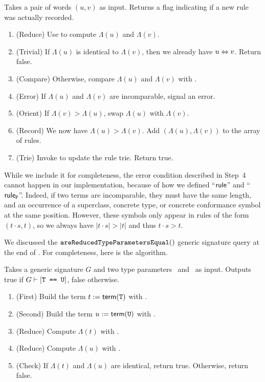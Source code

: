 \documentclass[../generics]{subfiles}
\begin{document}
\begin{algorithm}\label{add rewrite rule}
Takes a pair of words $(u,v)$ as input. Returns a flag indicating if a new rule was actually recorded.
\begin{enumerate}
\item (Reduce) Use  to compute $\Lambda(u)$ and $\Lambda(v)$.
\item (Trivial) If $\Lambda(u)$ is identical to $\Lambda(v)$, then we already have $u\Leftrightarrow v$. Return false.
\item (Compare) Otherwise, compare $\Lambda(u)$ and $\Lambda(v)$ with .
\item (Error) If $\Lambda(u)$ and $\Lambda(v)$ are incomparable, signal an error.
\item (Orient) If $\Lambda(v)>\Lambda(u)$, swap $\Lambda(u)$ with $\Lambda(v)$.
\item (Record) We now have $\Lambda(u)>\Lambda(v)$. Add $(\Lambda(u),\Lambda(v))$ to the array of rules.
\item (Trie) Invoke  to update the rule trie. Return true.
\end{enumerate}
\end{algorithm}
While we include it for completeness, the error condition described in Step~4 cannot happen in our implementation, because of how we defined ``$\mathsf{rule}$'' and ``$\mathsf{rule}_{\texttt{P}}$''. Indeed, if two terms are incomparable, they must have the same length, and an occurrence of a superclass, concrete type, or concrete conformance symbol at the same position. However, these symbols only appear in rules of the form $(t\cdot s,t)$, so we always have $|t\cdot s|>|t|$ and thus $t\cdot s>t$.

\pagebreak

We discussed the $\texttt{areReducedTypeParametersEqual}()$ generic signature query at the end of . For completeness, here is the algorithm.

\begin{algorithm}\label{alg:areReducedTypeParametersEqual}
Takes a generic signature $G$ and two type parameters \tT\ and \tU\ as input. Outputs true if $G\vdash\SameReq{\tT}{\tU}$, false otherwise.
\begin{enumerate}
\item (First) Build the term $t := \mathsf{term}(\texttt{T})$ with .
\item (Second) Build the term $u := \mathsf{term}(\texttt{U})$ with .
\item (Reduce) Compute $\Lambda(t)$ with .
\item (Reduce) Compute $\Lambda(u)$ with .
\item (Check) If $\Lambda(t)$ and $\Lambda(u)$ are identical, return true. Otherwise, return false.
\end{enumerate}
\end{algorithm}
\end{document}
